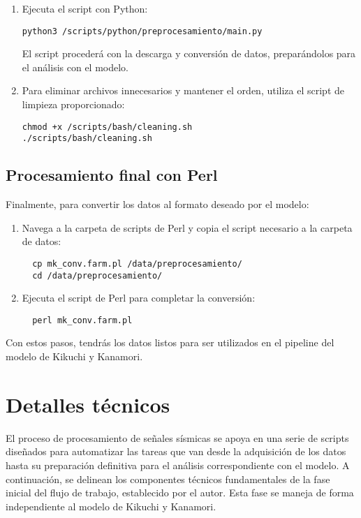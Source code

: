 \documentclass[a4paper,11pt]{refart}
\begin{document}
\begin{enumerate}
\item Ejecuta el script con Python:
\begin{verbatim}
python3 /scripts/python/preprocesamiento/main.py
\end{verbatim}
El script procederá con la descarga y conversión de datos, preparándolos para el análisis con el modelo.
\item Para eliminar archivos innecesarios y mantener el orden, utiliza el script de limpieza proporcionado:
\begin{verbatim}
chmod +x /scripts/bash/cleaning.sh
./scripts/bash/cleaning.sh
\end{verbatim}

\end{enumerate}

\subsection{Procesamiento final con Perl}

Finalmente, para convertir los datos al formato deseado por el modelo:
  \begin{enumerate}
  \item Navega a la carpeta de scripts de Perl y copia el script necesario a la carpeta de datos:
  \begin{verbatim}
  cp mk_conv.farm.pl /data/preprocesamiento/
  cd /data/preprocesamiento/
  \end{verbatim}
  \item Ejecuta el script de Perl para completar la conversión:
  \begin{verbatim}
  perl mk_conv.farm.pl
  \end{verbatim}
\end{enumerate}
Con estos pasos, tendrás los datos listos para ser utilizados en el pipeline del modelo de Kikuchi y Kanamori.

\section{Detalles técnicos}

El proceso de procesamiento de señales sísmicas se apoya en una serie de scripts diseñados para automatizar las tareas que van desde la adquisición de los datos hasta su preparación definitiva para el análisis correspondiente con el modelo. A continuación, se delinean los componentes técnicos fundamentales de la fase inicial del flujo de trabajo, establecido por el autor. Esta fase se maneja de forma independiente al modelo de Kikuchi y Kanamori.
\end{document}
